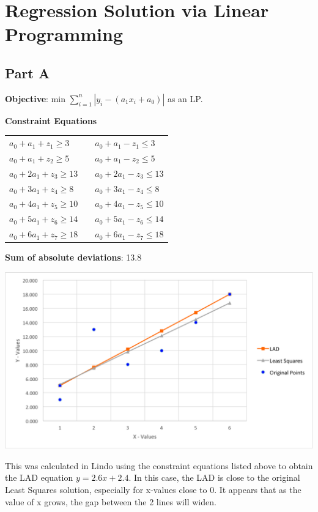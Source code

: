 \documentclass[11pt,letterpaper]{article}
\begin{document}
\section{Regression Solution via Linear Programming}
\subsection*{Part A}
\textbf{Objective}: min $\sum\limits_{i=1}^n |y_i -  (a_1x_i + a_0)|$ as an LP.\vspace{8pt}

\textbf{Constraint Equations}

\begin{tabular}{l l l}
$a_0+a_1+z_1\geq3$	&  & $a_0+a_1-z_1\leq3$\\
$a_0+a_1+z_2\geq5$ 	& & $a_0+a_1-z_2\leq5$\\
$a_0+2a_1+z_3\geq13$	& & $a_0+2a_1-z_3\leq13$\\
$a_0+3a_1+z_4\geq8$	& & $a_0+3a_1-z_4\leq8$\\
$a_0+4a_1+z_5\geq10$	& & $a_0+4a_1-z_5\leq10$\\
$a_0+5a_1+z_6\geq14$	& & $a_0+5a_1-z_6\leq14$\\
$a_0+6a_1+z_7\geq18$	& & $a_0+6a_1-z_7\leq18$\\
\end{tabular}\vspace{8pt}


\textbf{Sum of absolute deviations}: 13.8\vspace{8pt}


\centerline{\includegraphics[width=7in]{lad.png}}\vspace{8pt}

This was calculated in Lindo using the constraint equations listed above to obtain the LAD equation $y = 2.6x + 2.4$. In this case, the LAD is close to the original Least Squares solution, especially for x-values close to 0. It appears that as the value of x grows, the gap between the 2 lines will widen.\vspace{8pt}
\end{document}
